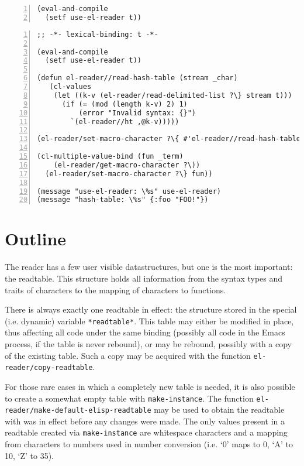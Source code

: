 \documentclass[a4paper,10pt,twoside]{report}
\newcommand{\elr}{el-reader}
\newcommand{\sym}[1]{\texttt{#1}}
\newcommand{\fun}[1]{\texttt{#1}}
\begin{document}
\begin{lstlisting}[style=lispcode,label={code:activate-el-reader},
caption={Activating \elr{}},numbers=left]
(eval-and-compile
  (setf use-el-reader t))
\end{lstlisting}

\begin{lstlisting}[style=lispcode,label={code:using-and-adding-elr},
caption={Using \elr{} and adding syntax},numbers=left]
;; -*- lexical-binding: t -*-

(eval-and-compile
  (setf use-el-reader t))

(defun el-reader//read-hash-table (stream _char)
   (cl-values
    (let ((k-v (el-reader/read-delimited-list ?\} stream t)))
      (if (= (mod (length k-v) 2) 1)
          (error "Invalid syntax: {}")
        `(el-reader//ht ,@k-v)))))

(el-reader/set-macro-character ?\{ #'el-reader//read-hash-table)

(cl-multiple-value-bind (fun _term)
    (el-reader/get-macro-character ?\))
  (el-reader/set-macro-character ?\} fun))

(message "use-el-reader: \%s" use-el-reader)
(message "hash-table: \%s" {:foo "FOO!"})
\end{lstlisting}

\section{Outline}
\label{sec:outline}

The reader has a few user visible datastructures, but one is the most important:
the readtable.  This structure holds all information from the syntax types and
traits of characters to the mapping of characters to functions.

There is always exactly one readtable in effect: the structure stored in the
special (i.e. dynamic) variable \sym{*readtable*}.  This table may either be
modified in place, thus affecting all code under the same binding (possibly all
code in the Emacs process, if the table is never rebound), or may be rebound,
possibly with a copy of the existing table.  Such a copy may be acquired with
the function \fun{el-reader/copy-readtable}.

For those rare cases in which a completely new table is needed, it is also
possible to create a somewhat empty table with \fun{make-instance}.\cite[Section
4, ``Making New Objects'']{eieio} The function
\fun{el-reader/make-default-elisp-readtable} may be used to obtain the readtable
with was in effect before any changes were made.  The only values present in a
readtable created via \fun{make-instance} are whitespace characters and a
mapping from characters to numbers used in number conversion (i.e. `0' maps to
0, `A' to 10, `Z' to 35).
\end{document}
